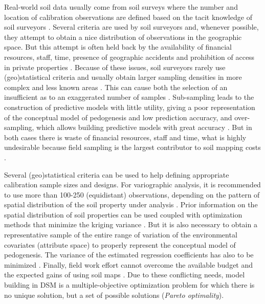 Real-world soil data usually come from soil surveys where the number and location of calibration 
observations are defined based on the tacit knowledge of soil surveyors \cite{BrusEtAl2007a}. 
Several criteria are used by soil surveyors and, whenever possible, they attempt to obtain a nice 
distribution of observations in the geographic space. But this attempt is often held back by the
availability of financial resources, staff, time, presence of geographic accidents and prohibition 
of access in private properties \cite{KempenEtAl2012, SamuelRosa2012}. Because of these issues, 
soil surveyors rarely use (geo)statistical criteria and usually obtain larger sampling densities in 
more complex and less known areas \cite{Rossiter2000}. This can cause both the selection of an 
insufficient as to an exaggerated number of samples \cite{vanGroenigenEtAl1999}. Sub-sampling leads 
to the construction of predictive models with little utility, giving a poor representation of the 
conceptual model of pedogenesis and low prediction accuracy, and over-sampling, which allows 
building predictive models with great accuracy \cite{vanGroenigenEtAl1999}. But in both cases there
is waste of financial resources, staff and time, what is highly undesirable because field sampling 
is the largest contributor to soil mapping costs \cite{vanGroenigenEtAl1999, KempenEtAl2012, 
SamuelRosa2012}.

Several (geo)statistical criteria can be used to help defining appropriate calibration sample sizes 
and designs. For variographic analysis, it is recommended to use more than 100-250 (equidistant) 
observations, depending on the pattern of spatial distribution of the soil property under analysis 
\cite{WebsterEtAl2007}. Prior information on the spatial distribution of soil properties can be 
used coupled with optimization methods that minimize the kriging variance 
\cite{vanGroenigenEtAl1999, BrusEtAl2007a}. But it is also necessary to obtain a representative 
sample of the entire range of variation of the environmental covariates (attribute space) 
\cite{HenglEtAl2003a} to properly represent the conceptual model of pedogenesis. The variance of the 
estimated regression coefficients has also to be minimized \cite{BrusEtAl2007a}. Finally, field 
work effort cannot overcome the available budget and the expected gains of using soil maps 
\cite{KempenEtAl2012}. Due to these conflicting needs, model building in DSM is a 
multiple-objective optimization problem for which there is no unique solution, but a set of possible
solutions (\textit{Pareto optimality}).


